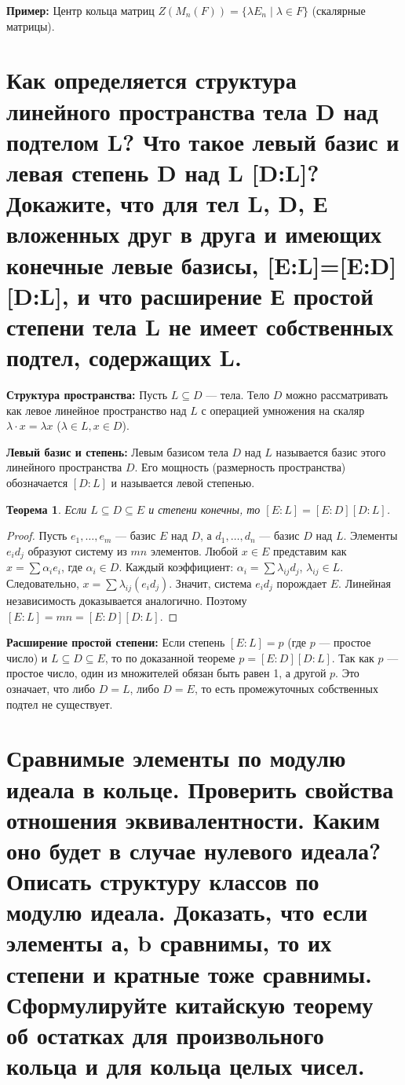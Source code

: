 \documentclass[12pt, a4paper]{article}
\theoremstyle{definition}
\theoremstyle{plain}
\newtheorem{theorem}{Теорема}[section]
\begin{document}
	\textbf{Пример:} Центр кольца матриц $Z(M_n(F)) = \{\lambda E_n \mid \lambda \in F\}$ (скалярные матрицы).
	
	\newpage
	\section{Как определяется структура линейного пространства тела D над подтелом L? Что такое левый базис и левая степень D над L [D:L]? Докажите, что для тел L, D, Е вложенных друг в друга и имеющих конечные левые базисы, [E:L]=[E:D][D:L], и что расширение Е простой степени тела L не имеет собственных подтел, содержащих L.}
	
	\textbf{Структура пространства:} Пусть $L \subseteq D$ — тела. Тело $D$ можно рассматривать как левое линейное пространство над $L$ с операцией умножения на скаляр $\lambda \cdot x = \lambda x$ ($\lambda \in L, x \in D$).
	
	\textbf{Левый базис и степень:} Левым базисом тела $D$ над $L$ называется базис этого линейного пространства $D$. Его мощность (размерность пространства) обозначается $[D:L]$ и называется левой степенью.
	
	\begin{theorem}
		Если $L \subseteq D \subseteq E$ и степени конечны, то $[E:L] = [E:D][D:L]$.
	\end{theorem}
	\begin{proof}
		Пусть $e_1, \dots, e_m$ — базис $E$ над $D$, а $d_1, \dots, d_n$ — базис $D$ над $L$. Элементы $e_i d_j$ образуют систему из $mn$ элементов. Любой $x \in E$ представим как $x = \sum \alpha_i e_i$, где $\alpha_i \in D$. Каждый коэффициент: $\alpha_i = \sum \lambda_{ij} d_j$, $\lambda_{ij} \in L$. Следовательно, $x = \sum \lambda_{ij} (e_i d_j)$. Значит, система $e_i d_j$ порождает $E$. Линейная независимость доказывается аналогично. Поэтому $[E:L] = mn = [E:D][D:L]$.
	\end{proof}
	
	\textbf{Расширение простой степени:} Если степень $[E:L] = p$ (где $p$ — простое число) и $L \subseteq D \subseteq E$, то по доказанной теореме $p = [E:D][D:L]$. Так как $p$ — простое число, один из множителей обязан быть равен 1, а другой $p$. Это означает, что либо $D=L$, либо $D=E$, то есть промежуточных собственных подтел не существует.
	
	\newpage
	\section{Сравнимые элементы по модулю идеала в кольце. Проверить свойства отношения эквивалентности. Каким оно будет в случае нулевого идеала? Описать структуру классов по модулю идеала. Доказать, что если элементы а, b сравнимы, то их степени и кратные тоже сравнимы. Сформулируйте китайскую теорему об остатках для произвольного кольца и для кольца целых чисел.}
	
\end{document}
